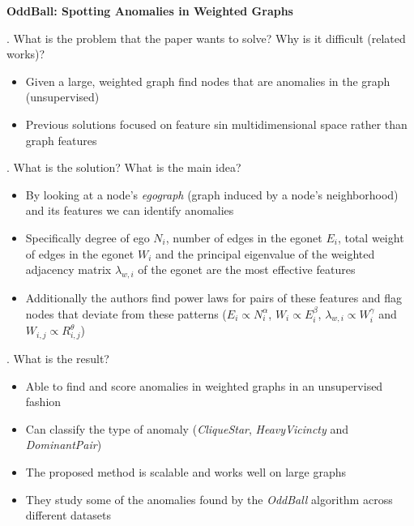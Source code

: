 \documentclass[12pt]{article}
\begin{document}
 

{\Large\centering
    \textbf{OddBall: Spotting Anomalies in Weighted Graphs}
\par}

\bigskip

. What is the problem that the paper wants to solve? Why is it difficult (related works)?

\begin{itemize}
    \item Given a large, weighted graph find nodes that are anomalies in the graph (unsupervised)
    \item Previous solutions focused on feature sin multidimensional space rather than graph features
\end{itemize}

. What is the solution? What is the main idea?

\begin{itemize}
    \item By looking at a node's \emph{egograph} (graph induced by a node's neighborhood) and its features we can identify anomalies
    \item Specifically degree of ego $N_i$, number of edges in the egonet $E_i$, total weight of edges in the egonet $W_i$ and the principal eigenvalue of the weighted adjacency matrix $\lambda_{w,i}$ of the egonet are the most effective features
    \item Additionally the authors find power laws for pairs of these features and flag nodes that deviate from these patterns ($E_i \propto N_i^\alpha$, $W_i \propto E_i^\beta$, $\lambda_{w,i} \propto W_i^\gamma$ and $W_{i,j} \propto R_{i,j}^\theta$)
\end{itemize}

. What is the result?

\begin{itemize}
    \item Able to find and score anomalies in weighted graphs in an unsupervised fashion
    \item Can classify the type of anomaly (\emph{CliqueStar}, \emph{HeavyVicincty} and \emph{DominantPair})
    \item The proposed method is scalable and works well on large graphs
    \item They study some of the anomalies found by the \emph{OddBall} algorithm across different datasets
\end{itemize}
\end{document}
